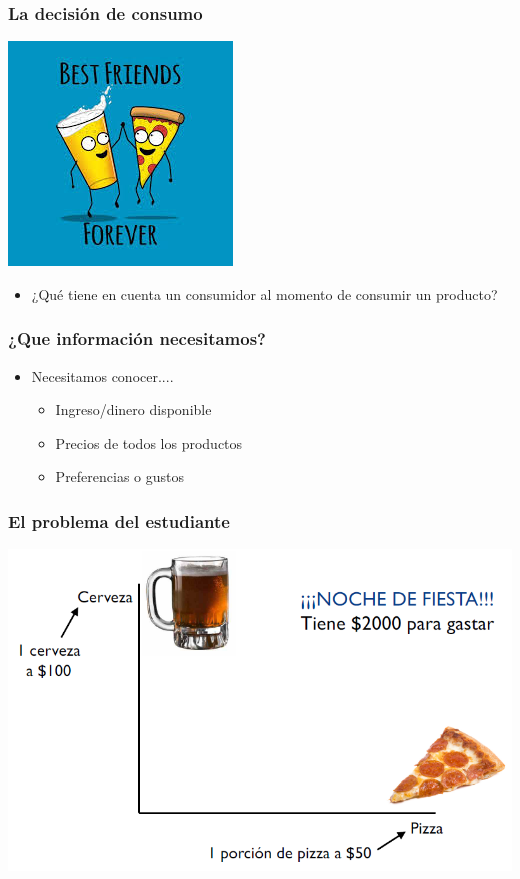 \documentclass{beamer}
\begin{document}
\begin{frame}
\frametitle{La decisión de consumo}
\centering
\includegraphics[scale=0.7]{../Figures/Tema_02.1_pizzabirra.jpg}
\begin{itemize}
\item ¿Qué tiene en cuenta un consumidor al momento de consumir un producto?
\end{itemize}
\end{frame}

\begin{frame}
\frametitle{¿Que información necesitamos?}
\begin{itemize}
\item Necesitamos conocer....
\begin{itemize}
    \item Ingreso/dinero disponible \vspace{2mm}
    \item Precios de todos los productos \vspace{2mm}
    \item Preferencias o gustos
    \end{itemize}
\end{itemize}
\end{frame}

\begin{frame}
\frametitle{El problema del estudiante}
\centering
\includegraphics[scale=0.5]{../Figures/Tema_02.2_rp.png}
\end{frame}
\end{document}
